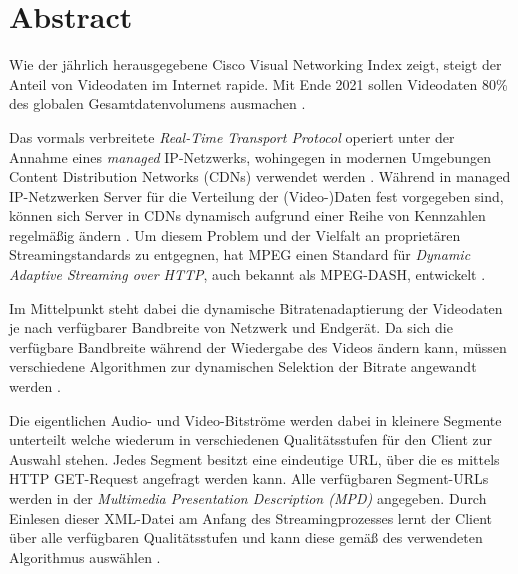 \documentclass[paper = a4, fontsize = 12pt, parskip = half]{scrartcl} %
\begin{document}


\tableofcontents
\pagebreak



\setcounter{page}{1}
\onehalfspacing

\section*{Abstract}
Wie der jährlich herausgegebene Cisco Visual Networking Index \cite{cisco_syst_inc_cisco_2017} zeigt, steigt der Anteil von Videodaten im Internet rapide. Mit Ende 2021 sollen Videodaten 80\% des globalen Gesamtdatenvolumens ausmachen \cite{cisco_syst_inc_cisco_2017}.

Das vormals verbreitete \textit{Real-Time Transport Protocol} operiert unter der Annahme eines \textit{managed} IP-Netzwerks, wohingegen in modernen Umgebungen Content Distribution Networks (CDNs) verwendet werden \cite{sodagar_mpeg-dash_2011}. Während in managed IP-Netzwerken Server für die Verteilung der (Video-)Daten fest vorgegeben sind, können sich Server in CDNs dynamisch aufgrund einer Reihe von Kennzahlen regelmäßig ändern \cite{buyya_content_2008}. Um diesem Problem und der Vielfalt an proprietären Streamingstandards zu entgegnen, hat MPEG einen Standard für \textit{Dynamic Adaptive Streaming over HTTP}, auch bekannt als MPEG-DASH, entwickelt \cite{sodagar_mpeg-dash_2011}.

Im Mittelpunkt steht dabei die dynamische Bitratenadaptierung der Videodaten je nach verfügbarer Bandbreite von Netzwerk und Endgerät. Da sich die verfügbare Bandbreite während der Wiedergabe des Videos ändern kann, müssen verschiedene Algorithmen zur dynamischen Selektion der Bitrate angewandt werden \cite{bentaleb_survey_2019}.

Die eigentlichen Audio- und Video-Bitströme werden dabei in kleinere Segmente unterteilt welche wiederum in verschiedenen Qualitätsstufen für den Client zur Auswahl stehen. Jedes Segment besitzt eine eindeutige URL, über die es mittels HTTP GET-Request angefragt werden kann. Alle verfügbaren Segment-URLs werden in der \textit{Multimedia Presentation Description (MPD)} angegeben. Durch Einlesen dieser XML-Datei am Anfang des Streamingprozesses lernt der Client über alle verfügbaren Qualitätsstufen und kann diese gemäß des verwendeten Algorithmus auswählen \cite{sodagar_mpeg-dash_2011}.
\end{document}
